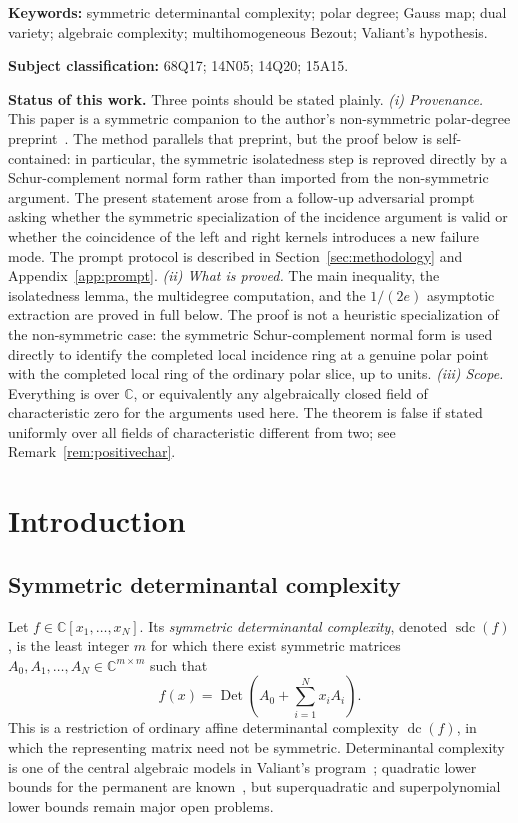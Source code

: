 \documentclass[11pt]{article}
\theoremstyle{plain}
\theoremstyle{definition}
\DeclareMathOperator{\sdc}{sdc}
\DeclareMathOperator{\dc}{dc}
\DeclareMathOperator{\Det}{Det}
\newcommand{\CC}{\mathbb{C}}
\begin{document}
\noindent\textbf{Keywords:} symmetric determinantal complexity; polar degree;
Gauss map; dual variety; algebraic complexity; multihomogeneous Bezout;
Valiant's hypothesis.

\medskip
\noindent\textbf{Subject classification:} 68Q17; 14N05; 14Q20; 15A15.

\medskip
\noindent\textbf{Status of this work.}
Three points should be stated plainly.
\emph{(i) Provenance.}  This paper is a symmetric companion to the author's
non-symmetric polar-degree preprint~\cite{SheshadriArxiv}.  The method parallels
that preprint, but the proof below is self-contained: in particular, the
symmetric isolatedness step is reproved directly by a Schur-complement normal
form rather than imported from the non-symmetric argument.  The present statement
arose from a follow-up adversarial prompt asking whether the symmetric
specialization of the incidence argument is valid or whether the coincidence of
the left and right kernels introduces a new failure mode.  The prompt protocol is
described in Section~\ref{sec:methodology} and Appendix~\ref{app:prompt}.
\emph{(ii) What is proved.}  The main inequality, the isolatedness lemma, the
multidegree computation, and the $1/(2e)$ asymptotic extraction are proved in
full below.  The proof is not a heuristic specialization of the non-symmetric
case: the symmetric Schur-complement normal form is used directly to identify
the completed local incidence ring at a genuine polar point with the completed
local ring of the ordinary polar slice, up to units.
\emph{(iii) Scope.}  Everything is over $\CC$, or equivalently any algebraically
closed field of characteristic zero for the arguments used here.  The theorem is
false if stated uniformly over all fields of characteristic different from two;
see Remark~\ref{rem:positivechar}.

\section{Introduction}
\label{sec:intro}

\subsection{Symmetric determinantal complexity}

Let $f\in\CC[x_1,\ldots,x_N]$.  Its \emph{symmetric determinantal complexity},
denoted $\sdc(f)$, is the least integer $m$ for which there exist symmetric
matrices $A_0,A_1,\ldots,A_N\in\CC^{m\times m}$ such that
\[
  f(x)=\Det\!\left(A_0+\sum_{i=1}^N x_iA_i\right).
\]
This is a restriction of ordinary affine determinantal complexity $\dc(f)$, in
which the representing matrix need not be symmetric.  Determinantal complexity
is one of the central algebraic models in Valiant's program~\cite{Valiant79};
quadratic lower bounds for the permanent are known~\cite{MignonRessayre04}, but
superquadratic and superpolynomial lower bounds remain major open problems.
\end{document}
